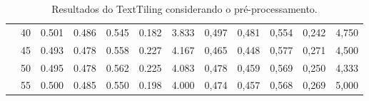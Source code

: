 \begin{table}[!h]
\begin{tabular}{|c|c||c|c|c|c|c||c|c|c|c|c|}
  & 40 & 0.501 & 0.486 & 0.545 & 0.182  & 3.833                & 0,497 & 0,481 & 0,554 & 0,242 & 4,750  \\ \cline{2-12} 
  & 45 & 0.493 & 0.478 & 0.558 & 0.227  & 4.167                & 0,465 & 0,448 & 0,577 & 0,271 & 4,500  \\ \cline{2-12} 
  & 50 & 0.495 & 0.478 & 0.562 & 0.225  & 4.083                & 0,478 & 0,459 & 0,569 & 0,250 & 4,333  \\ \cline{2-12} 
  & 55 & 0.500 & 0.485 & 0.550 & 0.198  & 4.000                & 0,474 & 0,457 & 0,568 & 0,269 & 5,000  \\ \hline      

 \end{tabular}  
\caption{Resultados do TextTiling considerando o pré-processamento.}
\label{tab:resultados-tt-pp}
\end{table} 


























